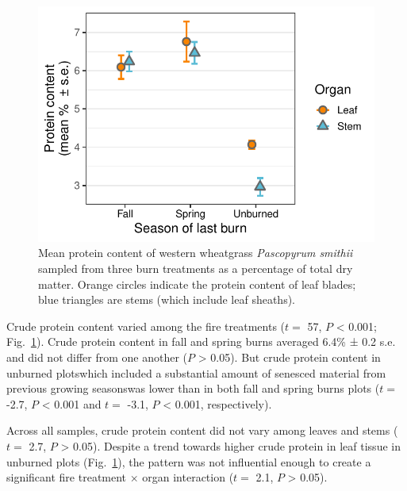 \documentclass[referee, 
	            sn-basic]
           {sn-jnl}
\begin{document}
\begin{linenumbers}
\begin{figure}
\centering
\includegraphics{value_gg-1.pdf}
\caption{Mean protein content of western wheatgrass \emph{Pascopyrum smithii} sampled from three burn treatments as a percentage of total dry matter. 
Orange circles indicate the protein content of leaf blades; blue triangles are stems (which include leaf sheaths).}
 \label{value} %
\end{figure}

Crude protein content varied among the fire treatments (\(t =\) 57, \(P\) \textless{} 0.001; Fig.~\ref{value}). 
Crude protein content in fall and spring burns averaged 6.4\% ± 0.2 s.e. and did not differ from one another (\(P\) \textgreater{} 0.05). 
But crude protein content in unburned  plots\textemdash which included a substantial amount of senesced material from previous growing seasons\textemdash was lower than in both fall and spring burns plots (\(t =\) -2.7, \(P\) \textless{} 0.001 and \(t =\) -3.1, \(P\) \textless{} 0.001, respectively).

Across all samples, crude protein content did not vary among leaves and
stems (\(t =\) 2.7, \(P\) \textgreater{} 0.05). Despite a trend towards
higher crude protein in leaf tissue in unburned plots (Fig.~\ref{value}), the
pattern was not influential enough to create a significant fire
treatment \(\times\) organ interaction (\(t =\) 2.1, \(P\)
\textgreater{} 0.05).


\end{linenumbers}
\end{document}
